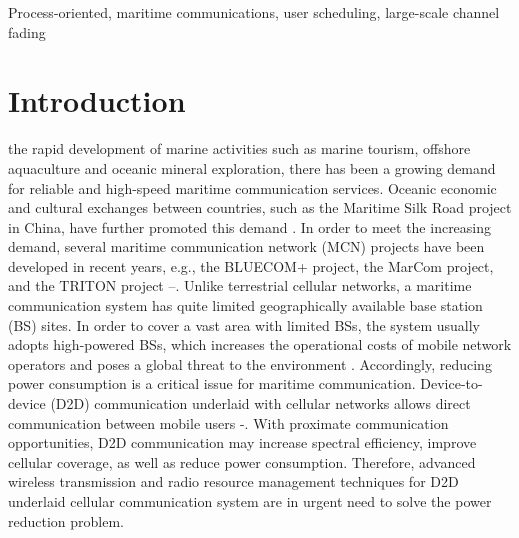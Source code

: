 \documentclass{ieeeaccess}
\begin{document}
\begin{keywords}
Process-oriented, maritime communications, user scheduling, large-scale channel fading
\end{keywords}

\titlepgskip=-15pt

\maketitle

\section{Introduction}
 the rapid development of marine activities such as marine tourism, offshore aquaculture and oceanic mineral exploration, there has been a growing demand for reliable and high-speed maritime communication services. Oceanic economic and cultural exchanges between countries, such as the Maritime Silk Road project in China, have further promoted this demand \cite{p322}\cite{p101}. In order to meet the increasing demand, several maritime communication network (MCN) projects have been developed in recent years, e.g., the BLUECOM+ project, the MarCom project, and the TRITON project \cite{p321}--\cite{p32}.
Unlike terrestrial cellular networks, a maritime communication system has quite limited geographically available base station (BS) sites. In order to cover a vast area with limited BSs, the system usually adopts high-powered BSs, which increases the operational costs of mobile network operators and poses a global threat to the environment \cite{p33}.
Accordingly, reducing power consumption is a critical issue for maritime communication.
Device-to-device (D2D) communication underlaid with cellular networks allows direct communication between mobile users \cite{p101}-\cite{p103}. With proximate communication opportunities, D2D communication may increase spectral efficiency, improve cellular coverage, as well as reduce power consumption.
Therefore, advanced wireless transmission and radio resource management techniques for D2D underlaid cellular communication system are in urgent need to solve the power reduction problem.
\end{document}
